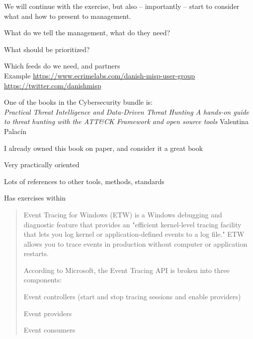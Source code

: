 \documentclass[Screen16to9,17pt]{foils}
\begin{document}



We will continue with the exercise, but also -- importantly -- start to consider what and how to present to management.

\begin{list2}
\item What do we tell the management, what do they need?
\item What should be prioritized?
\item Which feeds do we need, and partners\\
Example \url{https://www.ecrimelabs.com/danish-misp-user-group} \url{https://twitter.com/danishmisp}
\end{list2}



One of the books in the Cybersecurity bundle is:\\
\emph{Practical Threat Intelligence and Data-Driven Threat Hunting A hands-on guide to threat hunting with the
ATT\&CK Framework and open source tools} Valentina Palacín

\begin{list2}
\item I already owned this book on paper, and consider it a great book
\item Very practically oriented
\item Lots of references to other tools, methods, standards
\item Has exercises within
\end{list2}



\begin{quote}
Event Tracing for Windows (ETW) is a Windows debugging and diagnostic feature
that provides an "efficient kernel-level tracing facility that lets you log kernel or
application-defined events to a log file." ETW allows you to trace events in production
without computer or application restarts.

According to Microsoft, the Event Tracing API is broken into three components:
\begin{list2}
\item Event controllers (start and stop tracing sessions and enable providers)
\item Event providers
\item Event consumers
\end{list2}
\end{quote}
\end{document}

